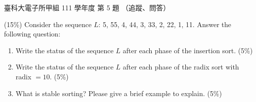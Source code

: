 \begin{pastexam}[label={px:ntust-111-et-ds-05}]{臺科大電子所甲組 111 學年度 第 5 題}
（追蹤、問答）

(15\%) Consider the sequence $L$: 5, 55, 4, 44, 3, 33, 2, 22, 1, 11. Answer the following question:
\begin{enumerate}[label=(\arabic*)]
\item Write the status of the sequence $L$ after each phase of the insertion sort. (5\%)
\item Write the status of the sequence $L$ after each phase of the radix sort with radix $=10$. (5\%)
\item What is stable sorting? Please give a brief example to explain. (5\%)
\end{enumerate}
\end{pastexam}

